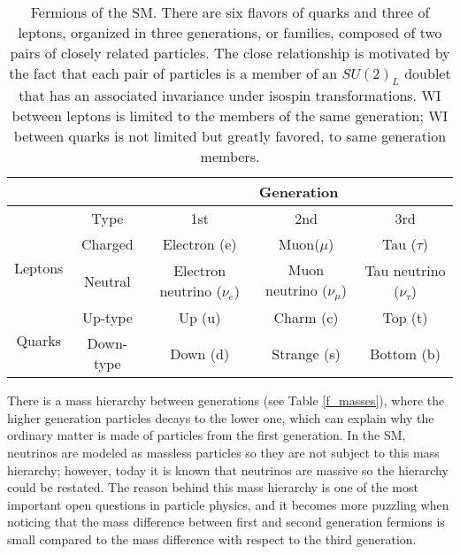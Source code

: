 \begin{table}[h!]
\centering
\footnotesize
\begin{tabular}{ccccc} \hline
                         &         & \multicolumn{3}{c}{Generation}                                                           \\ \hline
                         &Type     & 1st                          & 2nd                        & 3rd                          \\ \hline
\multirow{2}{*}{Leptons} &Charged  & Electron (e)                 & Muon($\mu$)                & Tau ($\tau$)                 \\%
                         &Neutral  & Electron neutrino ($\nu_e$)  & Muon neutrino ($\nu_{\mu}$) & Tau neutrino ($\nu_{\tau}$) \\\hline
\multirow{2}{*}{Quarks}  &Up-type  & Up (u)                       & Charm (c)                & Top (t)                        \\%
                         &Down-type& Down (d)                     & Strange (s)              & Bottom (b)                     \\\hline
\end{tabular}
\caption[Fermions of the SM.]{Fermions of the SM. There are six flavors of quarks and three of leptons, organized in three generations, or families, composed of two pairs of closely related particles. The close relationship is motivated by the fact that each pair of particles is a member of an $SU(2)_L$ doublet that has an associated invariance under isospin transformations. WI between leptons is limited to the members of the same generation; WI between quarks is not limited but greatly favored, to same generation members. }\label{flav_gen}
\end{table}

There is a mass hierarchy between generations (see Table \ref{f_masses}), where the higher generation particles decays to the lower one, which can explain why the ordinary matter is made of particles from the first generation. In the SM, neutrinos are modeled as massless particles so they are not subject to this mass hierarchy; however, today it is known that neutrinos are massive so the hierarchy could be restated. The reason behind this mass hierarchy is one of the most important open questions in particle physics, and it becomes more puzzling when noticing that the mass difference between first and second generation fermions is small compared to the mass difference with respect to the third generation.

